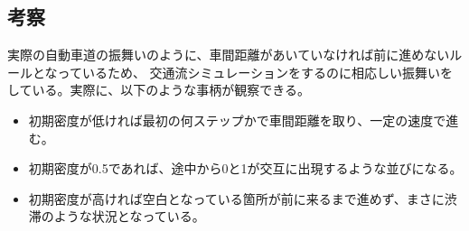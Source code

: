 \documentclass{jsarticle}
\begin{document}
\subsection{考察}

実際の自動車道の振舞いのように、車間距離があいていなければ前に進めないルールとなっているため、
交通流シミュレーションをするのに相応しい振舞いをしている。実際に、以下のような事柄が観察できる。

\begin{itemize}
\item 初期密度が低ければ最初の何ステップかで車間距離を取り、一定の速度で進む。
\item 初期密度が0.5であれば、途中から0と1が交互に出現するような並びになる。
\item 初期密度が高ければ空白となっている箇所が前に来るまで進めず、まさに渋滞のような状況となっている。
\end{itemize}
\end{document}
